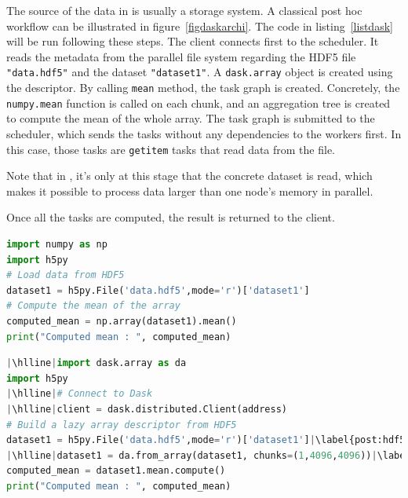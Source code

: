The source of the data in \dask is usually a storage system. A classical post hoc workflow can be illustrated in figure~\ref{figdaskarchi}. The code in listing~\ref{listdask} will be run following these steps. The client connects first to the scheduler. It reads the metadata from the parallel file system regarding the HDF5 file \texttt{"data.hdf5"} and the dataset \texttt{"dataset1"}. A \texttt{dask.array} object is created using the descriptor. By calling \texttt{mean} method, the task graph is created. Concretely, the \texttt{numpy.mean} function is called on each chunk, and an aggregation tree is created to compute the mean of the whole array. The task graph is submitted to the scheduler, which sends the tasks without any dependencies to the workers first. In this case, those tasks are \texttt{getitem} tasks that read data from the file. 

Note that in \dask, it's only at this stage that the concrete dataset is read, which makes it possible to process data larger than one node's memory in parallel.

Once all the tasks are computed, the result is returned to the client.

\begin{lstlisting}[float, label=listnumpy, language=python, caption=Sequential post hoc mean using numpy]
import numpy as np
import h5py
# Load data from HDF5
dataset1 = h5py.File('data.hdf5',mode='r')['dataset1']
# Compute the mean of the array
computed_mean = np.array(dataset1).mean()
print("Computed mean : ", computed_mean)
\end{lstlisting}

\begin{lstlisting}[float, label=listdask, language=python, caption=Parallel post hoc mean with \dask. Lines differing from the analysis of Listing~\ref{listnumpy} are highlighted]
|\hlline|import dask.array as da
import h5py
|\hlline|# Connect to Dask
|\hlline|client = dask.distributed.Client(address)
# Build a lazy array descriptor from HDF5
dataset1 = h5py.File('data.hdf5',mode='r')['dataset1']|\label{post:hdf5}|
|\hlline|dataset1 = da.from_array(dataset1, chunks=(1,4096,4096))|\label{post:chunk}|
computed_mean = dataset1.mean.compute()
print("Computed mean : ", computed_mean)
\end{lstlisting}

